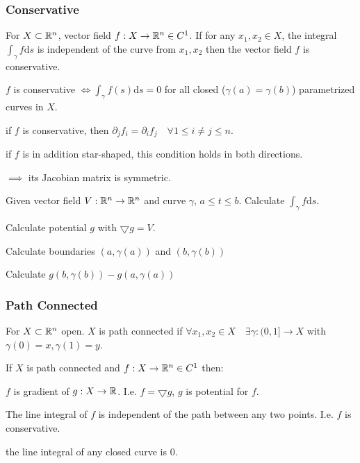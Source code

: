 \subsubsection{Conservative}
For $X \subset \mathbb{R}^n$, vector field $f: X \to \mathbb{R}^n \in C^1$. If for any $x_1, x_2 \in X$, the integral $\int_{\gamma} f \mathrm{d}s$ is independent of the curve from $x_1, x_2$ then the vector field $f$ is conservative.

\begin{compactitem}
    \item $f$ is conservative $\iff \int_{\gamma} f(s) \mathrm{d}s = 0$ for all closed ($\gamma(a) = \gamma(b)$) parametrized curves in $X$.
    \item if $f$ is conservative, then $\partial_j f_i = \partial_i f_j \quad \forall 1 \le i \neq j \le n$.
        \begin{compactitem}
            \item if $f$ is in addition star-shaped, this condition holds in both directions.
            \item $\implies$ its Jacobian matrix is symmetric.
        \end{compactitem}
\end{compactitem}

Given vector field $V: \mathbb{R}^n \to \mathbb{R}^n$ and curve $\gamma$, $a \le t \le b$. Calculate $\int_{\gamma} f \mathrm{d}s$.

\begin{compactitem}
    \item Calculate potential $g$ with $\bigtriangledown g = V$.
    \item Calculate boundaries $(a, \gamma(a))$ and $(b, \gamma(b))$
    \item Calculate $g(b, \gamma(b)) - g(a, \gamma(a))$
\end{compactitem}


\subsubsection{Path Connected}
For $X \subset \mathbb{R}^n$ open. $X$ is path connected if $\forall x_1, x_2 \in X \quad \exists \gamma: (0, 1] \to X$ with $\gamma(0) = x, \gamma(1) = y$.

If $X$ is path connected and $f: X \to \mathbb{R}^n \in C^1$ then:
\begin{compactitem}
    \item $f$ is gradient of $g: X \to \mathbb{R}$. I.e. $f = \bigtriangledown g$, $g$ is potential for $f$.
    \item The line integral of $f$ is independent of the path between any two points. I.e. $f$ is conservative.
    \item the line integral of any closed curve is $0$.
\end{compactitem}

